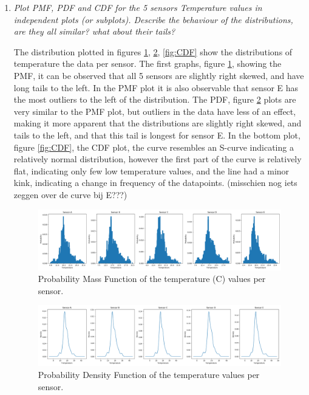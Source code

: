 \documentclass[a4paper,12pt]{article} %
\begin{document}
\begin{enumerate}
\item {\it Plot PMF, PDF and CDF for the 5 sensors Temperature values in independent plots (or subplots). Describe the behaviour of the distributions, are they all similar? what about their tails?}

The distribution plotted in figures \ref{fig:PMF}, \ref{fig:PDF}, \ref{fig:CDF} show the distributions of temperature the data per sensor. The first graphs, figure \ref{fig:PMF}, showing the PMF, it can be observed that all 5 sensors are slightly right skewed, and have long tails to the left. In the PMF plot it is also observable that sensor E has the most outliers to the left of the distribution. The PDF, figure \ref{fig:PDF} plots are very similar to the PMF plot, but outliers in the data have less of an effect, making it more apparent that the distributions are slightly right skewed, and tails to the left, and that this tail is longest for sensor E. In the bottom plot, figure \ref{fig:CDF}, the CDF plot, the curve resembles an S-curve indicating a relatively normal distribution, however the first part of the curve is relatively flat, indicating only few low temperature values, and the line had a minor kink, indicating a change in frequency of the datapoints.  (misschien nog iets zeggen over de curve bij E???) 

 \begin{figure}[H] 
	\centering
	\includegraphics[width=1\textwidth]{PMF of temperature per sensor.png} 
	\caption{Probability Mass Function of the temperature (\degree C) values per sensor.} %
	\label{fig:PMF}
\end{figure} 

 \begin{figure}[H] 
	\centering
	\includegraphics[width=1\textwidth]{PDF of temperature per sensor.png} 
	\caption{Probability Density Function of the temperature values per sensor.} %
	\label{fig:PDF}
\end{figure} 


\end{enumerate}
\end{document}
